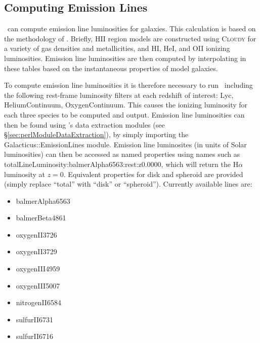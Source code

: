 \subsection{Computing Emission Lines}\label{sec:EmissionLineTutorial}

\glc\ can compute emission line luminosities for galaxies. This calculation is based on the methodology of \cite{panuzzo_dust_2003}. Briefly, HII region models are constructed using {\normalfont \scshape Cloudy} for a variety of gas densities and metallicities, and HI, HeI, and OII ionizing luminosities. Emission line luminosities are then computed by interpolating in these tables based on the instantaneous properties of model galaxies.

To compute emission line luminosities it is therefore necessary to run \glc\ including the following rest-frame luminosity filters at each redshift of interest: {\normalfont \ttfamily Lyc}, {\normalfont \ttfamily HeliumContinuum}, {\normalfont \ttfamily OxygenContinuum}. This causes the ionizing luminosity for each three species to be computed and output. Emission line luminosities can then be found using \glc's data extraction modules (see \S\ref{sec:perlModuleDataExtraction}), by simply importing the {\normalfont \ttfamily Galacticus::EmissionLines} module. Emission line luminosites (in units of Solar luminosities) can then be accessed as named properties using names such as {\normalfont \ttfamily totalLineLuminosity:balmerAlpha6563:rest:z0.0000}, which will return the H$\alpha$ luminosity at $z=0$. Equivalent properties for disk and spheroid are provided (simply replace ``{\normalfont \ttfamily total}'' with ``{\normalfont \ttfamily disk}'' or ``{\normalfont \ttfamily spheroid}''). Currently available lines are:
\begin{itemize}
\item {\normalfont \ttfamily balmerAlpha6563}
\item {\normalfont \ttfamily balmerBeta4861}
\item {\normalfont \ttfamily oxygenII3726}
\item {\normalfont \ttfamily oxygenII3729}
\item {\normalfont \ttfamily oxygenIII4959}
\item {\normalfont \ttfamily oxygenIII5007}
\item {\normalfont \ttfamily nitrogenII6584}
\item {\normalfont \ttfamily sulfurII6731}
\item {\normalfont \ttfamily sulfurII6716}
\end{itemize}


